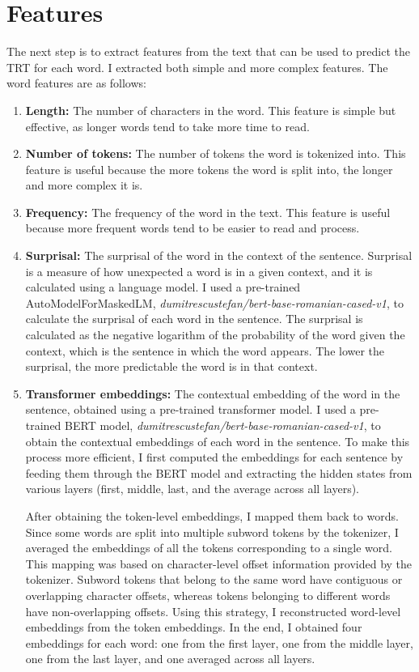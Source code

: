 \section{Features}
The next step is to extract features from the text that can be used to predict the TRT for each word. I extracted both simple and more complex features. The word features are as follows:

\begin{enumerate}
    \item \textbf{Length:} The number of characters in the word. This feature is simple but effective, as longer words tend to take more time to read.
    
    \item \textbf{Number of tokens:} The number of tokens the word is tokenized into. This feature is useful because the more tokens the word is split into, the longer and more complex it is.
    
    \item \textbf{Frequency:} The frequency of the word in the text. This feature is useful because more frequent words tend to be easier to read and process.
    
    \item \textbf{Surprisal:} The surprisal of the word in the context of the sentence. Surprisal is a measure of how unexpected a word is in a given context, and it is calculated using a language model. I used a pre-trained AutoModelForMaskedLM, \textit{dumitrescustefan/bert-base-romanian-cased-v1}, to calculate the surprisal of each word in the sentence. The surprisal is calculated as the negative logarithm of the probability of the word given the context, which is the sentence in which the word appears. The lower the surprisal, the more predictable the word is in that context.
    
    \item \textbf{Transformer embeddings:} The contextual embedding of the word in the sentence, obtained using a pre-trained transformer model. I used a pre-trained BERT model, \textit{dumitrescustefan/bert-base-romanian-cased-v1}, to obtain the contextual embeddings of each word in the sentence. To make this process more efficient, I first computed the embeddings for each sentence by feeding them through the BERT model and extracting the hidden states from various layers (first, middle, last, and the average across all layers).

    After obtaining the token-level embeddings, I mapped them back to words. Since some words are split into multiple subword tokens by the tokenizer, I averaged the embeddings of all the tokens corresponding to a single word. This mapping was based on character-level offset information provided by the tokenizer. Subword tokens that belong to the same word have contiguous or overlapping character offsets, whereas tokens belonging to different words have non-overlapping offsets. Using this strategy, I reconstructed word-level embeddings from the token embeddings. In the end, I obtained four embeddings for each word: one from the first layer, one from the middle layer, one from the last layer, and one averaged across all layers.
\end{enumerate}


